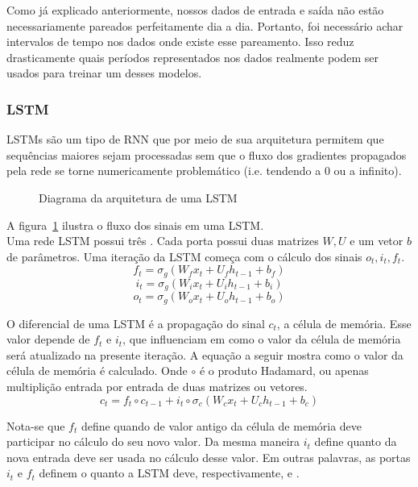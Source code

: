 Como já explicado anteriormente, nossos dados de entrada e saída não estão necessariamente pareados perfeitamente dia a dia. Portanto, foi necessário achar intervalos de tempo nos dados onde existe esse pareamento. Isso reduz drasticamente quais períodos representados nos dados realmente podem ser usados para treinar um desses modelos.


\subsubsection{LSTM}

LSTMs \citep{lstm} são um tipo de RNN que por meio de sua arquitetura permitem que sequências
maiores sejam processadas sem que o fluxo dos gradientes propagados pela rede se torne
numericamente problemático (i.e. tendendo a 0 ou a infinito).


\begin{figure}
\centering
\caption{Diagrama da arquitetura de uma LSTM}

\label{fig:lstm}
\end{figure}


A figura~\ref{fig:lstm} ilustra o fluxo dos sinais em uma LSTM. \\
Uma rede LSTM possui três . Cada porta possui duas matrizes $W,U$ e um
vetor $b$ de parâmetros. Uma iteração da LSTM começa com o cálculo dos sinais
$o_t,i_t,f_t$.\\

\[f_t = \sigma_g(W_fx_t + U_fh_{t-1} + b_f)\]
\[i_t = \sigma_g(W_ix_t + U_ih_{t-1} + b_i)\]
\[o_t = \sigma_g(W_ox_t + U_oh_{t-1} + b_o)\]

O diferencial de uma LSTM é a propagação do sinal $c_t$, a célula de memória.
Esse valor depende de $f_t$ e $i_t$, que influenciam em como o valor da
célula de memória será atualizado na presente iteração. A equação a seguir
mostra como o valor da célula de memória é calculado. Onde $\circ$ é o produto Hadamard, ou apenas multiplição entrada por entrada de
duas matrizes ou vetores. \\

\[c_t = f_t \circ c_{t-1} + i_t \circ \sigma_c(W_cx_t + U_ch_{t-1} + b_c)\]

Nota-se que $f_t$
define quando de valor antigo da célula de memória deve participar no cálculo do
seu novo valor. 
Da mesma maneira $i_t$ define quanto da nova entrada deve ser usada no cálculo desse valor.
Em outras palavras, as portas $i_t$ e $f_t$ definem o quanto a LSTM deve,
respectivamente,  e .



